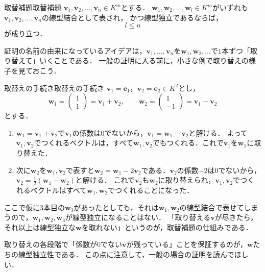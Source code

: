 \begin{lemma}{取替補題}{取替補題}
  $\bm{v}_1, \bm{v}_2, \dots, \bm{v}_n \in K^m$とする．
  $\bm{w}_1, \bm{w}_2, \dots, \bm{w}_l \in K^m$がいずれも$\bm{v}_1, \bm{v}_2, \dots, \bm{v}_n$の線型結合として表され，
  かつ線型独立であるならば，
  \[
    l \le n
  \]
  が成り立つ．
\end{lemma}

証明の名前の由来になっているアイデアは，$\bm{v}_1, \dots, \bm{v}_n$を$\bm{w}_1, \bm{w}_2, \dots$で$1$本ずつ「取り替えて」いくことである．
一般の証明に入る前に，小さな例で取り替えの様子を見ておこう．

\begin{example}{取替えの手続き}{取替えの手続き}
  $\bm{v}_1 = \bm{e}_1$，$\bm{v}_2 = \bm{e}_2 \in K^2$とし，
  \[
    \bm{w}_1 = \begin{pmatrix} 1 \\ 1 \end{pmatrix} = \bm{v}_1 + \bm{v}_2, \qquad
    \bm{w}_2 = \begin{pmatrix} 1 \\ -1 \end{pmatrix} = \bm{v}_1 - \bm{v}_2
  \]
  とする．
  \begin{enumerate}[label=(\arabic*),leftmargin=3.2em]
    \item $\bm{w}_1 = \bm{v}_1 + \bm{v}_2$で$\bm{v}_1$の係数は$0$でないから，$\bm{v}_1 = \bm{w}_1 - \bm{v}_2$と解ける．
      よって$\bm{v}_1, \bm{v}_2$でつくれるベクトルは，すべて$\bm{w}_1, \bm{v}_2$でもつくれる．これで$\bm{v}_1$を$\bm{w}_1$に取り替えた．
    \item 次に$\bm{w}_2$を$\bm{w}_1, \bm{v}_2$で表すと$\bm{w}_2 = \bm{w}_1 - 2\bm{v}_2$である．$\bm{v}_2$の係数$-2$は$0$でないから，$\bm{v}_2 = \frac{1}{2}(\bm{w}_1 - \bm{w}_2)$と解ける．
      これで$\bm{v}_2$も$\bm{w}_2$に取り替えられ，$\bm{v}_1, \bm{v}_2$でつくれるベクトルはすべて$\bm{w}_1, \bm{w}_2$でつくれることになった．
  \end{enumerate}
  ここで仮に$3$本目の$\bm{w}_3$があったとしても，それは$\bm{w}_1, \bm{w}_2$の線型結合で表せてしまうので，$\bm{w}_1, \bm{w}_2, \bm{w}_3$が線型独立になることはない．
  「取り替える$\bm{v}$が尽きたら，それ以上は線型独立な$\bm{w}$を取れない」というのが，取替補題の仕組みである．
\end{example}

取り替えの各段階で「係数が$0$でない$\bm{v}$が残っている」ことを保証するのが，$\bm{w}$たちの線型独立性である．
この点に注意して，一般の場合の証明を読んでほしい．

